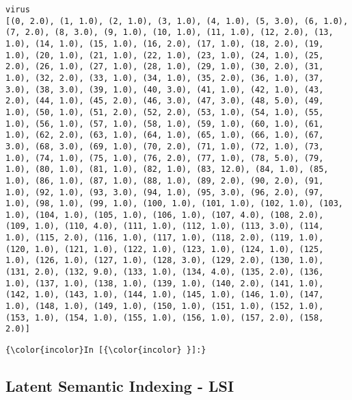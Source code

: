 \documentclass[11pt]{article}
\begin{document}
    \begin{Verbatim}[commandchars=\\\{\}]
virus
[(0, 2.0), (1, 1.0), (2, 1.0), (3, 1.0), (4, 1.0), (5, 3.0), (6, 1.0), (7, 2.0), (8, 3.0), (9, 1.0), (10, 1.0), (11, 1.0), (12, 2.0), (13, 1.0), (14, 1.0), (15, 1.0), (16, 2.0), (17, 1.0), (18, 2.0), (19, 1.0), (20, 1.0), (21, 1.0), (22, 1.0), (23, 1.0), (24, 1.0), (25, 2.0), (26, 1.0), (27, 1.0), (28, 1.0), (29, 1.0), (30, 2.0), (31, 1.0), (32, 2.0), (33, 1.0), (34, 1.0), (35, 2.0), (36, 1.0), (37, 3.0), (38, 3.0), (39, 1.0), (40, 3.0), (41, 1.0), (42, 1.0), (43, 2.0), (44, 1.0), (45, 2.0), (46, 3.0), (47, 3.0), (48, 5.0), (49, 1.0), (50, 1.0), (51, 2.0), (52, 2.0), (53, 1.0), (54, 1.0), (55, 1.0), (56, 1.0), (57, 1.0), (58, 1.0), (59, 1.0), (60, 1.0), (61, 1.0), (62, 2.0), (63, 1.0), (64, 1.0), (65, 1.0), (66, 1.0), (67, 3.0), (68, 3.0), (69, 1.0), (70, 2.0), (71, 1.0), (72, 1.0), (73, 1.0), (74, 1.0), (75, 1.0), (76, 2.0), (77, 1.0), (78, 5.0), (79, 1.0), (80, 1.0), (81, 1.0), (82, 1.0), (83, 12.0), (84, 1.0), (85, 1.0), (86, 1.0), (87, 1.0), (88, 1.0), (89, 2.0), (90, 2.0), (91, 1.0), (92, 1.0), (93, 3.0), (94, 1.0), (95, 3.0), (96, 2.0), (97, 1.0), (98, 1.0), (99, 1.0), (100, 1.0), (101, 1.0), (102, 1.0), (103, 1.0), (104, 1.0), (105, 1.0), (106, 1.0), (107, 4.0), (108, 2.0), (109, 1.0), (110, 4.0), (111, 1.0), (112, 1.0), (113, 3.0), (114, 1.0), (115, 2.0), (116, 1.0), (117, 1.0), (118, 2.0), (119, 1.0), (120, 1.0), (121, 1.0), (122, 1.0), (123, 1.0), (124, 1.0), (125, 1.0), (126, 1.0), (127, 1.0), (128, 3.0), (129, 2.0), (130, 1.0), (131, 2.0), (132, 9.0), (133, 1.0), (134, 4.0), (135, 2.0), (136, 1.0), (137, 1.0), (138, 1.0), (139, 1.0), (140, 2.0), (141, 1.0), (142, 1.0), (143, 1.0), (144, 1.0), (145, 1.0), (146, 1.0), (147, 1.0), (148, 1.0), (149, 1.0), (150, 1.0), (151, 1.0), (152, 1.0), (153, 1.0), (154, 1.0), (155, 1.0), (156, 1.0), (157, 2.0), (158, 2.0)]

    \end{Verbatim}

    \begin{Verbatim}[commandchars=\\\{\}]
{\color{incolor}In [{\color{incolor} }]:} 
\end{Verbatim}

    \subsection{Latent Semantic Indexing -
LSI}\label{latent-semantic-indexing---lsi}
\end{document}
